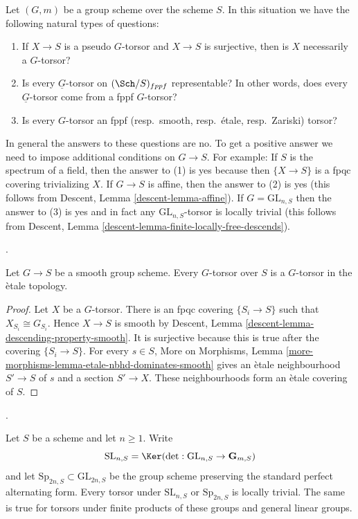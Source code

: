 \begin{remark}
\label{remark-fun-with-torsors}
Let $(G, m)$ be a group scheme over the scheme $S$.
In this situation we have the following natural types of questions:
\begin{enumerate}
\item If $X \to S$ is a pseudo $G$-torsor and $X \to S$ is surjective,
then is $X$ necessarily a $G$-torsor?
\item Is every $\underline{G}$-torsor on $(\Sch/S)_{fppf}$
representable? In other words, does every $\underline{G}$-torsor
come from a fppf $G$-torsor?
\item Is every $G$-torsor an
fppf (resp.\ smooth, resp.\ \'etale, resp.\ Zariski) torsor?
\end{enumerate}
In general the answers to these questions are no. To get a positive answer
we need to impose additional conditions on $G \to S$.
For example:
If $S$ is the spectrum of a field, then the answer to (1) is yes
because then $\{X \to S\}$ is a fpqc covering trivializing $X$.
If $G \to S$ is affine, then the answer to (2) is yes
(this follows from Descent, Lemma \ref{descent-lemma-affine}).
If $G = \text{GL}_{n, S}$ then the answer to (3) is yes
and in fact any $\text{GL}_{n, S}$-torsor is locally trivial
(this follows from
Descent, Lemma \ref{descent-lemma-finite-locally-free-descends}).
\end{remark}

\begin{lemma}
\label{lemma-smooth-torsor-etale}
\begin{reference}
\cite[Expos\'e 190, n\textsuperscript{o} 6, p. 326]{FGA}.
\end{reference}
Let $G \to S$ be a smooth group scheme. Every $G$-torsor over $S$
is a $G$-torsor in the \`etale topology.
\end{lemma}

\begin{proof}
Let $X$ be a $G$-torsor. There is an fpqc covering
$\{S_i \to S\}$ such that $X_{S_i} \cong G_{S_i}$. Hence $X \to S$
is smooth by Descent, Lemma
\ref{descent-lemma-descending-property-smooth}. It is surjective because
this is true after the covering $\{S_i \to S\}$. For every $s \in S$,
More on Morphisms, Lemma
\ref{more-morphisms-lemma-etale-nbhd-dominates-smooth}
gives an \`etale neighbourhood $S' \to S$ of $s$ and a section
$S' \to X$. These neighbourhoods form an \`etale covering of $S$.
\end{proof}

\begin{lemma}
\label{lemma-torsors-special-linear-symplectic}
\begin{reference}
\cite[Expos\'e 190, Proposition 6.1 and the discussion following it,
p. 326]{FGA}.
\end{reference}
Let $S$ be a scheme and let $n \geq 1$. Write
$$
\text{SL}_{n, S} = \Ker(\det :
\text{GL}_{n, S} \to \mathbf{G}_{m, S})
$$
and let $\text{Sp}_{2n, S} \subset \text{GL}_{2n, S}$ be the group
scheme preserving the standard perfect alternating form. Every torsor under
$\text{SL}_{n, S}$ or $\text{Sp}_{2n, S}$ is locally trivial. The same is
true for torsors under finite products of these groups and general linear
groups.
\end{lemma}


